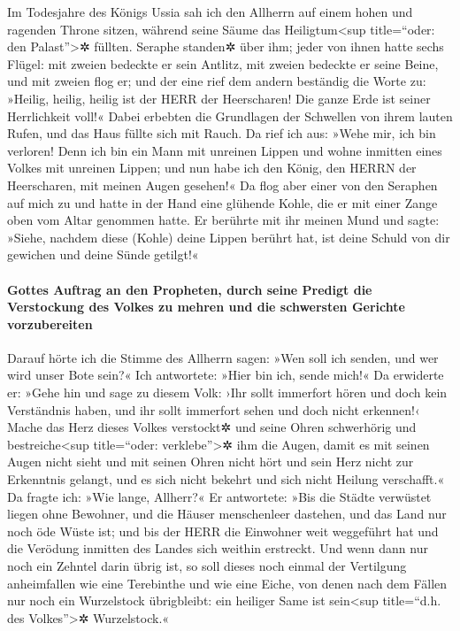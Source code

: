 Im Todesjahre des Königs Ussia sah ich den Allherrn auf
einem hohen und ragenden Throne sitzen, während seine Säume das
Heiligtum\textless sup title=``oder: den Palast''\textgreater✲ füllten.
Seraphe standen✲ über ihm; jeder von ihnen hatte sechs
Flügel: mit zweien bedeckte er sein Antlitz, mit zweien bedeckte er
seine Beine, und mit zweien flog er; und der eine rief dem
andern beständig die Worte zu: »Heilig, heilig, heilig ist der HERR der
Heerscharen! Die ganze Erde ist seiner Herrlichkeit voll!«
Dabei erbebten die Grundlagen der Schwellen von ihrem
lauten Rufen, und das Haus füllte sich mit Rauch. Da rief
ich aus: »Wehe mir, ich bin verloren! Denn ich bin ein Mann mit unreinen
Lippen und wohne inmitten eines Volkes mit unreinen Lippen; und nun habe
ich den König, den HERRN der Heerscharen, mit meinen Augen gesehen!«
Da flog aber einer von den Seraphen auf mich zu und hatte
in der Hand eine glühende Kohle, die er mit einer Zange oben vom Altar
genommen hatte. Er berührte mit ihr meinen Mund und sagte:
»Siehe, nachdem diese (Kohle) deine Lippen berührt hat, ist deine Schuld
von dir gewichen und deine Sünde getilgt!«

\hypertarget{gottes-auftrag-an-den-propheten-durch-seine-predigt-die-verstockung-des-volkes-zu-mehren-und-die-schwersten-gerichte-vorzubereiten}{%
\paragraph{Gottes Auftrag an den Propheten, durch seine Predigt die
Verstockung des Volkes zu mehren und die schwersten Gerichte
vorzubereiten}\label{gottes-auftrag-an-den-propheten-durch-seine-predigt-die-verstockung-des-volkes-zu-mehren-und-die-schwersten-gerichte-vorzubereiten}}

Darauf hörte ich die Stimme des Allherrn sagen: »Wen soll
ich senden, und wer wird unser Bote sein?« Ich antwortete: »Hier bin
ich, sende mich!« Da erwiderte er: »Gehe hin und sage zu
diesem Volk: ›Ihr sollt immerfort hören und doch kein Verständnis haben,
und ihr sollt immerfort sehen und doch nicht erkennen!‹
Mache das Herz dieses Volkes verstockt✲ und seine Ohren
schwerhörig und bestreiche\textless sup title=``oder:
verklebe''\textgreater✲ ihm die Augen, damit es mit seinen Augen nicht
sieht und mit seinen Ohren nicht hört und sein Herz nicht zur Erkenntnis
gelangt, und es sich nicht bekehrt und sich nicht Heilung verschafft.«
Da fragte ich: »Wie lange, Allherr?« Er antwortete: »Bis
die Städte verwüstet liegen ohne Bewohner, und die Häuser menschenleer
dastehen, und das Land nur noch öde Wüste ist; und bis
der HERR die Einwohner weit weggeführt hat und die Verödung inmitten des
Landes sich weithin erstreckt. Und wenn dann nur noch ein
Zehntel darin übrig ist, so soll dieses noch einmal der Vertilgung
anheimfallen wie eine Terebinthe und wie eine Eiche, von denen nach dem
Fällen nur noch ein Wurzelstock übrigbleibt: ein heiliger Same ist
sein\textless sup title=``d.h. des Volkes''\textgreater✲ Wurzelstock.«

